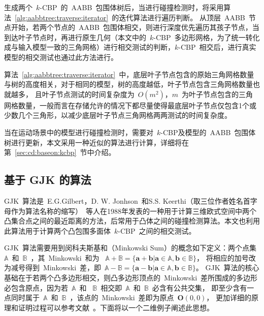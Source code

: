生成两个~$k$-CBP~的~AABB~包围体树后，当进行碰撞检测时，将采用算法~\ref{alg:aabbtree:traverse:iterator}~的迭代算法进行遍历判断。
从顶层~AABB~节点开始，若两个节点的~AABB~包围体相交，则进行深度优先遍历其孩子节点，当到达叶子节点时，再进行原生几何（本文中的~$k$-CBP~多边形网格，为了统一转化成与输入模型一致的三角网格）进行相交测试的判断，$k$-CBP~相交后，进行真实模型的相交测试也通过此方法进行。

算法~\ref{alg:aabbtree:traverse:iterator}~中，底层叶子节点包含的原始三角网格数量与树的高度相关，对于相同的模型，树的高度越低，叶子节点包含三角网格数量也就越多，
且叶子节点测试的时间复杂度为~$O(m^2)$，$m$~为叶子节点包含的三角网格数量，一般而言在存储允许的情况下都尽量使得最底层叶子节点仅包含1个或少数几个三角形，以减少底层叶子节点三角网格两两测试的时间复杂度。

当在运动场景中的模型进行碰撞检测时，需要对~$k$-CBP及模型的~AABB~包围体树进行更新，本文采用一种近似的算法进行计算，详细将在第~\ref{sec:cd:baseon:kcbp}~节中介绍。

\subsection{基于 GJK 的算法}
\label{subsec:kcbp:cd:gjk}

GJK~算法是~E.G.Gilbert，D. W. Jonhson~和S.S. Keerthi（取三位作者姓名首字母作为算法名称的缩写）~等人在1988年发表的一种用于计算三维欧式空间中两个凸集合点之间的最近距离的方法\cite{gilbert1988fast}，后常用于凸体之间的碰撞检测算法\cite{bergen1999fast}。本文也利用此算法用于计算两个凸包围多面体~$k$-CBP~之间的相交测试。

GJK~算法需要用到闵科夫斯基和（Minkowski Sum）的概念如下定义：两个点集~$\mathbb{A}$~和~$\mathbb{B}$~，其~Minkowski~和为
~$\mathbb{A} + \mathbb{B} = \{ \bm{a} + \bm{b} | \bm{a} \in \mathbb{A}, \bm{b} \in \mathbb{B}\}$， 
将相应的加号改为减号得到~Minkowski~差，即~$\mathbb{A} - \mathbb{B} = \{ \bm{a} - \bm{b} | \bm{a} \in \mathbb{A}, \bm{b} \in \mathbb{B}\} $。
GJK~算法的核心基础在于若两个凸多边形相交，则凸多边形顶点的~Minkowski~差所围成的多边形必包含原点，因为若~$\mathbb{A}$~和
~$\mathbb{B}$~相交即~$\mathbb{A}$~和~$\mathbb{B}$~必含有公共交集，
即至少含有一点同时属于~$\mathbb{A}$~和~$\mathbb{B}$~，该点的~Minkowski~差即为原点~$\bm{O}(0, 0)$，
更加详细的原理和证明过程可以参考文献~。下面将以一个二维例子阐述此思想。

